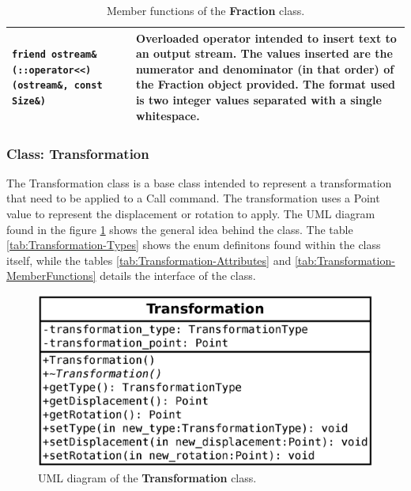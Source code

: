 \documentclass[11pt,twoside,openany,x11names,svgnames]{memoir}
\begin{document}
\begin{table}[h]
\begin{tabular}{| >{\bfseries}p{9cm} | p{6.5cm} |}
	\hline
	
	\texttt{friend ostream\& (::operator<<) (ostream\&, const Size\&)} & Overloaded operator intended to insert text to an output stream. The values inserted are the numerator and denominator (in that order) of the Fraction object provided. The format used is two integer values separated with a single whitespace. \\
	
	\hline
\end{tabular}
\caption{Member functions of the \textbf{Fraction} class.}
\label{tab:Fraction-MemberFunctions}
\end{table}

\clearpage

\subsubsection{Class: Transformation}\label{Class-Transformation}

The Transformation class is a base class intended to represent a transformation that need to be applied to a Call command. The transformation uses a Point value to represent the displacement or rotation to apply. The UML diagram found in the figure \ref{fig:class-transformation} shows the general idea behind the class. The table \ref{tab:Transformation-Types} shows the enum definitons found within the class itself, while the tables \ref{tab:Transformation-Attributes} and \ref{tab:Transformation-MemberFunctions} details the interface of the class.

\begin{figure}
	\centering
	\includegraphics[scale=0.2, clip=true, trim= 0pt 0pt 0pt 0pt]{images/chapter03-image15}
	\caption{UML diagram of the \textbf{Transformation} class.}
	\label{fig:class-transformation}
\end{figure}
\end{document}
